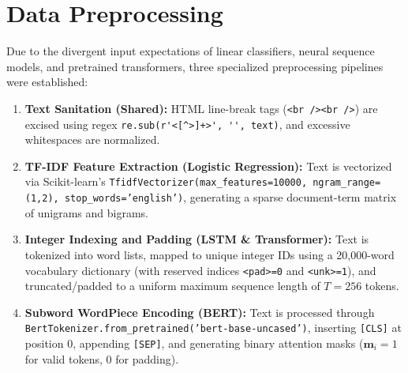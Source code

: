 \documentclass[12pt,a4paper]{report}
\begin{document}
\section{Data Preprocessing}
Due to the divergent input expectations of linear classifiers, neural sequence models, and pretrained transformers, three specialized preprocessing pipelines were established:
\begin{enumerate}
    \item \textbf{Text Sanitation (Shared):} HTML line-break tags (\lstinline|<br /><br />|) are excised using regex \lstinline|re.sub(r'<[^>]+>', '', text)|, and excessive whitespaces are normalized.
    \item \textbf{TF-IDF Feature Extraction (Logistic Regression):} Text is vectorized via Scikit-learn's \texttt{TfidfVectorizer(max\_features=10000, ngram\_range=(1,2), stop\_words='english')}, generating a sparse document-term matrix of unigrams and bigrams.
    \item \textbf{Integer Indexing and Padding (LSTM \& Transformer):} Text is tokenized into word lists, mapped to unique integer IDs using a 20,000-word vocabulary dictionary (with reserved indices \lstinline|<pad>=0| and \lstinline|<unk>=1|), and truncated/padded to a uniform maximum sequence length of $T = 256$ tokens.
    \item \textbf{Subword WordPiece Encoding (BERT):} Text is processed through \texttt{BertTokenizer.from\_pretrained('bert-base-uncased')}, inserting \texttt{[CLS]} at position 0, appending \texttt{[SEP]}, and generating binary attention masks ($\mathbf{m}_i = 1$ for valid tokens, $0$ for padding).
\end{enumerate}
\end{document}
